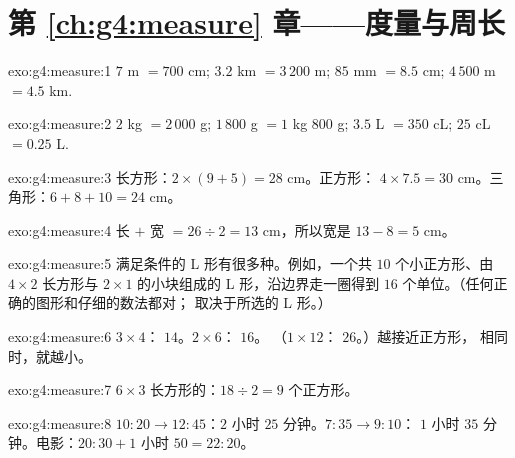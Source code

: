\section*{第 \ref{ch:g4:measure} 章——度量与周长}

\begin{solution}{exo:g4:measure:1}
$7$ m $= 700$ cm; \quad $3.2$ km $= 3\,200$ m; \quad
$85$ mm $= 8.5$ cm; \quad $4\,500$ m $= 4.5$ km.
\end{solution}

\begin{solution}{exo:g4:measure:2}
$2$ kg $= 2\,000$ g; \quad $1\,800$ g $= 1$ kg $800$ g; \quad
$3.5$ L $= 350$ cL; \quad $25$ cL $= 0.25$ L.
\end{solution}

\begin{solution}{exo:g4:measure:3}
长方形：$2 \times (9 + 5) = 28$ cm。正方形：
$4 \times 7.5 = 30$ cm。三角形：$6 + 8 + 10 = 24$ cm。
\end{solution}

\begin{solution}{exo:g4:measure:4}
长 $+$ 宽 $= 26 \div 2 = 13$ cm，所以宽是
$13 - 8 = 5$ cm。
\end{solution}

\begin{solution}{exo:g4:measure:5}
满足条件的 L 形有很多种。例如，一个共 $10$ 个小正方形、由
$4 \times 2$ 长方形与 $2 \times 1$ 的小块组成的 L 形，沿边界走一圈得到 $16$
个单位。（任何正确的图形和仔细的数法都对；
取决于所选的 L 形。）
\end{solution}

\begin{solution}{exo:g4:measure:6}
$3 \times 4$： $14$。$2 \times 6$： $16$。
（$1 \times 12$： $26$。）越接近正方形，
相同时，就越小。
\end{solution}

\begin{solution}{exo:g4:measure:7}
$6 \times 3$ 长方形的：$18 \div 2 = 9$ 个正方形。
\end{solution}

\begin{solution}{exo:g4:measure:8}
$10{:}20 \to 12{:}45$：$2$ 小时 $25$ 分钟。$7{:}35 \to 9{:}10$：
$1$ 小时 $35$ 分钟。电影：$20{:}30 + 1$ 小时 $50 = 22{:}20$。
\end{solution}

